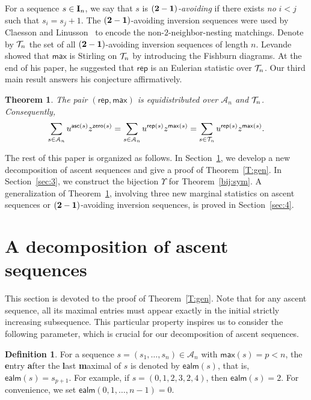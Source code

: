 \documentclass[12pt]{amsart}
\newcounter{mycount}
\theoremstyle{plain}
\newtheorem{theorem}[mycount]{Theorem}
\theoremstyle{definition}
\newtheorem{definition}{Definition}
\theoremstyle{example}
\theoremstyle{remark}
\numberwithin{equation}{section}
\numberwithin{figure}{section}
\newcommand{\asc}{\mathsf{asc}}
\def\max{\mathsf{max}}
\def\zero{\mathsf{zero}}
\def\rep{\mathsf{rep}}
\def\ealm{\mathsf{ealm}}
\def\A{\mathcal{A}}
\def\T{\CMcal{T}}
\def\I{\operatorname{{\bf I}}}
\begin{document}
For a sequence $s\in\I_n$, we say that $s$ is {\em $({\bf2-1})$-avoiding} if there exists {\em no}  $i<j$ such that $s_i=s_j+1$. The $({\bf2-1})$-avoiding inversion sequences were used by Claesson and Linusson~\cite{cl} to encode the non-$2$-neighbor-nesting matchings. Denote by $\T_n$  the set of all $({\bf2-1})$-avoiding inversion sequences of length $n$. Levande~\cite{lev} showed that $\max$ is  Stirling  on $\T_n$ by introducing the Fishburn diagrams. At the end of his paper, he suggested that $\rep$ is an Eulerian statistic over $\T_n$. Our third main result answers his conjecture affirmatively.

\begin{theorem}\label{main:3}
The pair $(\rep,\max)$ is equidistributed  over $\A_n$ and $\T_n$.
Consequently,
\begin{align}\label{E:rema2co}
\sum_{s\in\A_n}
u^{\asc(s)}z^{\zero(s)}=\sum_{s\in\A_n}
u^{\rep(s)}z^{\max(s)}
=\sum_{s\in\T_n}
u^{\rep(s)}z^{\max(s)}.
\end{align}
\end{theorem}

The rest of this paper is organized as follows. In Section~\ref{sec:2}, we develop a new decomposition of ascent sequences and give a proof of Theorem~\ref{T:gen}. In  Section~\ref{sec:3}, we construct the bijection $\Upsilon$ for Theorem~\ref{bij:sym}. A generalization of Theorem~\ref{main:3}, involving three new marginal statistics on ascent sequences or $({\bf2-1})$-avoiding inversion sequences, is proved in Section~\ref{sec:4}.





\section{A decomposition of ascent sequences}\label{sec:2}



This section is devoted to the proof of Theorem~\ref{T:gen}. Note that for any ascent sequence, all its maximal entries must appear exactly in the initial  strictly increasing subsequence. This particular property inspires us to consider the following parameter, which is crucial for our decomposition of ascent sequences.

\begin{definition}For a sequence $s=(s_1,\ldots,s_n)\in\A_n$ with $\max(s)=p<n$, the {\bf e}ntry {\bf a}fter the {\bf l}ast {\bf m}aximal of $s$ is denoted by $\ealm(s)$, that is, $\ealm(s)=s_{p+1}$. For example, if $s=(0,1,2,3,2,4)$, then $\ealm(s)=2$. For convenience, we set $\ealm(0,1,\ldots,n-1)=0$.
\end{definition}
\end{document}
